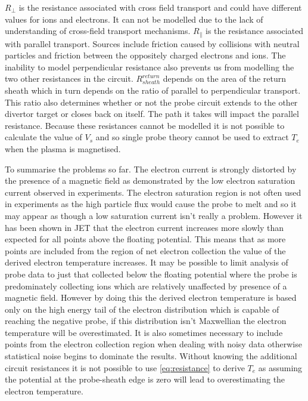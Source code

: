 \documentclass[12pt]{article}
\begin{document}
$R_{\perp}$ is the resistance associated with cross field transport and could have different values for ions and electrons. It can not be modelled due to the lack of understanding of cross-field transport mechanisms. $R_{\parallel}$ is the resistance associated with parallel transport. Sources include friction caused by collisions with neutral particles and friction between the oppositely charged electrons and ions. The inability to model perpendicular resistance also prevents us from modelling the two other resistances in the circuit. $R^{return}_{sheath}$ depends on the area of the return sheath which in turn depends on the ratio of parallel to perpendicular transport. This ratio also determines whether or not the probe circuit extends to the other divertor target or closes back on itself. The path it takes will impact the parallel resistance. Because these resistances cannot be modelled it is not possible to calculate the value of $V_s$ and so single probe theory cannot be used to extract $T_e$ when the plasma is magnetised. 

To summarise the problems so far. The electron current is strongly distorted by the presence of a magnetic field as demonstrated by the low electron saturation current observed in experiments. The electron saturation region is not often used in experiments as the high particle flux would cause the probe to melt and so it may appear as though a low saturation current isn't really a problem. However it has been shown in JET that the electron current increases more slowly than expected for all points above the floating potential. This means that as more points are included from the region of net electron collection the value of the derived electron temperature increases. It may be possible to limit analysis of probe data to just that collected below the floating potential where the probe is predominately collecting ions which are relatively unaffected by presence of a magnetic field. However by doing this the derived electron temperature is based only on the high energy tail of the electron distribution which is capable of reaching the negative probe, if this distribution isn't Maxwellian the electron temperature will be overestimated. It is also sometimes necessary to include points from the electron collection region when dealing with noisy data otherwise statistical noise begins to dominate the results. Without knowing the additional circuit resistances it is not possible to use \eqref{eq:resistance} to derive $T_e$ as assuming the potential at the probe-sheath edge is zero will lead to overestimating the electron temperature.
\end{document}
